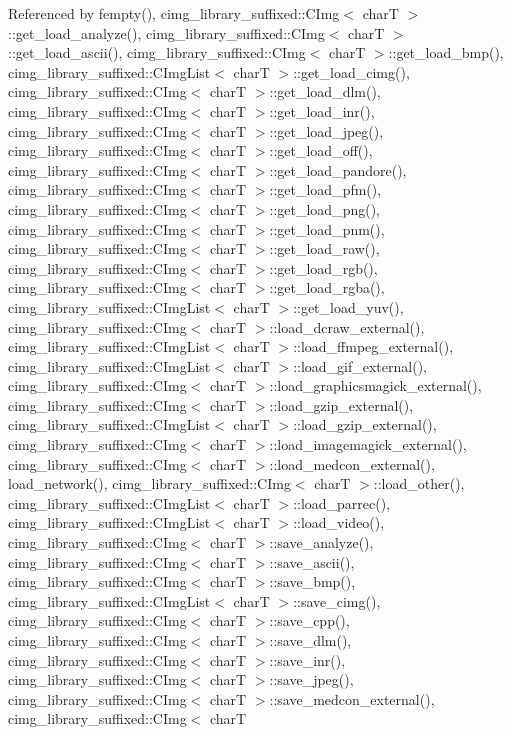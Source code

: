 Referenced by fempty(), cimg\+\_\+library\+\_\+suffixed\+::\+C\+Img$<$ char\+T $>$\+::get\+\_\+load\+\_\+analyze(), cimg\+\_\+library\+\_\+suffixed\+::\+C\+Img$<$ char\+T $>$\+::get\+\_\+load\+\_\+ascii(), cimg\+\_\+library\+\_\+suffixed\+::\+C\+Img$<$ char\+T $>$\+::get\+\_\+load\+\_\+bmp(), cimg\+\_\+library\+\_\+suffixed\+::\+C\+Img\+List$<$ char\+T $>$\+::get\+\_\+load\+\_\+cimg(), cimg\+\_\+library\+\_\+suffixed\+::\+C\+Img$<$ char\+T $>$\+::get\+\_\+load\+\_\+dlm(), cimg\+\_\+library\+\_\+suffixed\+::\+C\+Img$<$ char\+T $>$\+::get\+\_\+load\+\_\+inr(), cimg\+\_\+library\+\_\+suffixed\+::\+C\+Img$<$ char\+T $>$\+::get\+\_\+load\+\_\+jpeg(), cimg\+\_\+library\+\_\+suffixed\+::\+C\+Img$<$ char\+T $>$\+::get\+\_\+load\+\_\+off(), cimg\+\_\+library\+\_\+suffixed\+::\+C\+Img$<$ char\+T $>$\+::get\+\_\+load\+\_\+pandore(), cimg\+\_\+library\+\_\+suffixed\+::\+C\+Img$<$ char\+T $>$\+::get\+\_\+load\+\_\+pfm(), cimg\+\_\+library\+\_\+suffixed\+::\+C\+Img$<$ char\+T $>$\+::get\+\_\+load\+\_\+png(), cimg\+\_\+library\+\_\+suffixed\+::\+C\+Img$<$ char\+T $>$\+::get\+\_\+load\+\_\+pnm(), cimg\+\_\+library\+\_\+suffixed\+::\+C\+Img$<$ char\+T $>$\+::get\+\_\+load\+\_\+raw(), cimg\+\_\+library\+\_\+suffixed\+::\+C\+Img$<$ char\+T $>$\+::get\+\_\+load\+\_\+rgb(), cimg\+\_\+library\+\_\+suffixed\+::\+C\+Img$<$ char\+T $>$\+::get\+\_\+load\+\_\+rgba(), cimg\+\_\+library\+\_\+suffixed\+::\+C\+Img\+List$<$ char\+T $>$\+::get\+\_\+load\+\_\+yuv(), cimg\+\_\+library\+\_\+suffixed\+::\+C\+Img$<$ char\+T $>$\+::load\+\_\+dcraw\+\_\+external(), cimg\+\_\+library\+\_\+suffixed\+::\+C\+Img\+List$<$ char\+T $>$\+::load\+\_\+ffmpeg\+\_\+external(), cimg\+\_\+library\+\_\+suffixed\+::\+C\+Img\+List$<$ char\+T $>$\+::load\+\_\+gif\+\_\+external(), cimg\+\_\+library\+\_\+suffixed\+::\+C\+Img$<$ char\+T $>$\+::load\+\_\+graphicsmagick\+\_\+external(), cimg\+\_\+library\+\_\+suffixed\+::\+C\+Img$<$ char\+T $>$\+::load\+\_\+gzip\+\_\+external(), cimg\+\_\+library\+\_\+suffixed\+::\+C\+Img\+List$<$ char\+T $>$\+::load\+\_\+gzip\+\_\+external(), cimg\+\_\+library\+\_\+suffixed\+::\+C\+Img$<$ char\+T $>$\+::load\+\_\+imagemagick\+\_\+external(), cimg\+\_\+library\+\_\+suffixed\+::\+C\+Img$<$ char\+T $>$\+::load\+\_\+medcon\+\_\+external(), load\+\_\+network(), cimg\+\_\+library\+\_\+suffixed\+::\+C\+Img$<$ char\+T $>$\+::load\+\_\+other(), cimg\+\_\+library\+\_\+suffixed\+::\+C\+Img\+List$<$ char\+T $>$\+::load\+\_\+parrec(), cimg\+\_\+library\+\_\+suffixed\+::\+C\+Img\+List$<$ char\+T $>$\+::load\+\_\+video(), cimg\+\_\+library\+\_\+suffixed\+::\+C\+Img$<$ char\+T $>$\+::save\+\_\+analyze(), cimg\+\_\+library\+\_\+suffixed\+::\+C\+Img$<$ char\+T $>$\+::save\+\_\+ascii(), cimg\+\_\+library\+\_\+suffixed\+::\+C\+Img$<$ char\+T $>$\+::save\+\_\+bmp(), cimg\+\_\+library\+\_\+suffixed\+::\+C\+Img\+List$<$ char\+T $>$\+::save\+\_\+cimg(), cimg\+\_\+library\+\_\+suffixed\+::\+C\+Img$<$ char\+T $>$\+::save\+\_\+cpp(), cimg\+\_\+library\+\_\+suffixed\+::\+C\+Img$<$ char\+T $>$\+::save\+\_\+dlm(), cimg\+\_\+library\+\_\+suffixed\+::\+C\+Img$<$ char\+T $>$\+::save\+\_\+inr(), cimg\+\_\+library\+\_\+suffixed\+::\+C\+Img$<$ char\+T $>$\+::save\+\_\+jpeg(), cimg\+\_\+library\+\_\+suffixed\+::\+C\+Img$<$ char\+T $>$\+::save\+\_\+medcon\+\_\+external(), cimg\+\_\+library\+\_\+suffixed\+::\+C\+Img$<$ char\+T 